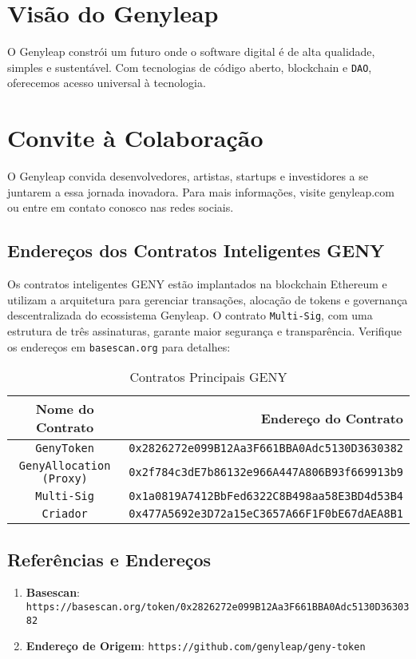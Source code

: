 \documentclass[a4paper,12pt,openany]{book}
\begin{document}
\chapter{Visão do Genyleap}
O Genyleap constrói um futuro onde o software digital é de alta qualidade, simples e sustentável. Com tecnologias de código aberto, blockchain e \texttt{DAO}, oferecemos acesso universal à tecnologia.

\chapter{Convite à Colaboração}
O Genyleap convida desenvolvedores, artistas, startups e investidores a se juntarem a essa jornada inovadora. Para mais informações, visite genyleap.com ou entre em contato conosco nas redes sociais.

\section*{Endereços dos Contratos Inteligentes GENY}
Os contratos inteligentes GENY estão implantados na blockchain Ethereum e utilizam a arquitetura  para gerenciar transações, alocação de tokens e governança descentralizada do ecossistema Genyleap. O contrato \texttt{Multi-Sig}, com uma estrutura de três assinaturas, garante maior segurança e transparência. Verifique os endereços em \texttt{basescan.org} para detalhes:

\begin{table}[h]
\centering
\caption*{Contratos Principais GENY}
\small
\begin{tabular}{c r}
\hline
\textbf{Nome do Contrato} & \textbf{Endereço do Contrato} \\
\hline
\texttt{GenyToken} & {\texttt{0x2826272e099B12Aa3F661BBA0Adc5130D3630382}} \\
\texttt{GenyAllocation (Proxy)} & {\texttt{0x2f784c3dE7b86132e966A447A806B93f669913b9}} \\
\texttt{Multi-Sig} & {\texttt{0x1a0819A7412BbFed6322C8B498aa58E3BD4d53B4}} \\
\texttt{Criador} & {\texttt{0x477A5692e3D72a15eC3657A66F1F0bE67dAEA8B1}} \\
\hline
\end{tabular}
\end{table}

\section*{Referências e Endereços}

\begin{enumerate}
    \item \textbf{Basescan}: \texttt{https://basescan.org/token/0x2826272e099B12Aa3F661BBA0Adc5130D3630382}
    \item \textbf{Endereço de Origem}: \texttt{https://github.com/genyleap/geny-token}
\end{enumerate}
\end{document}
